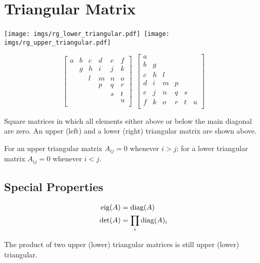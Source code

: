 \section{Triangular Matrix}

\begin{center}
\texttt{[image: imgs/rg\_lower\_triangular.pdf]}~\texttt{[image: imgs/rg\_upper\_triangular.pdf]}
\end{center}

\begin{equation}
\begin{bmatrix}
a & b & c & d & e & f \\
  & g & h & i & j & k \\
  &   & l & m & n & o \\
  &   &   & p & q & r \\
  &   &   &   & s & t \\
  &   &   &   &   & u \\
\end{bmatrix}
~
~
\begin{bmatrix}
a &   &   &   &   &   \\
b & g &   &   &   &   \\
c & h & l &   &   &   \\
d & i & m & p &   &   \\
e & j & n & q & s &   \\
f & k & o & r & t & u \\
\end{bmatrix}
\end{equation}

Square matrices in which all elements either above or below the main diagonal are zero. An upper (left) and a lower (right) triangular matrix are shown above.

For an upper triangular matrix $A_{ij}=0$ whenever $i>j$; for a lower triangular matrix $A_{ij}=0$ whenever $i<j$.


\subsection*{Special Properties}

\begin{align}
\operatorname{eig}(A) &= \operatorname{diag}(A)             \\
\det(A) &= \prod_i \operatorname{diag}(A)_i
\end{align}

The product of two upper (lower) triangular matrices is still upper (lower) triangular.

